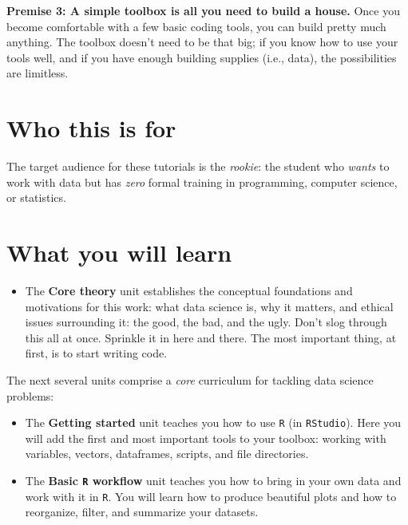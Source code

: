 \documentclass[
]{book}
\providecommand{\tightlist}{%
  \setlength{\itemsep}{0pt}\setlength{\parskip}{0pt}}
\begin{document}
\textbf{Premise 3: A simple toolbox is all you need to build a house.} Once you become comfortable with a few basic coding tools, you can build pretty much anything. The toolbox doesn't need to be that big; if you know how to use your tools well, and if you have enough building supplies (i.e., data), the possibilities are limitless.

\hypertarget{who-this-is-for}{%
\section*{Who this is for}\label{who-this-is-for}}

The target audience for these tutorials is the \emph{rookie}: the student who \emph{wants} to work with data but has \emph{zero} formal training in programming, computer science, or statistics.

\hypertarget{what-you-will-learn}{%
\section*{What you will learn}\label{what-you-will-learn}}

\begin{itemize}
\tightlist
\item
  The \textbf{Core theory} unit establishes the conceptual foundations and motivations for this work: what data science is, why it matters, and ethical issues surrounding it: the good, the bad, and the ugly. Don't slog through this all at once. Sprinkle it in here and there. The most important thing, at first, is to start writing code.
\end{itemize}

The next several units comprise a \emph{core} curriculum for tackling data science problems:

\begin{itemize}
\item
  The \textbf{Getting started} unit teaches you how to use \texttt{R} (in \texttt{RStudio}). Here you will add the first and most important tools to your toolbox: working with variables, vectors, dataframes, scripts, and file directories.
\item
  The \textbf{Basic \texttt{R} workflow} unit teaches you how to bring in your own data and work with it in \texttt{R}. You will learn how to produce beautiful plots and how to reorganize, filter, and summarize your datasets.
\end{itemize}
\end{document}
